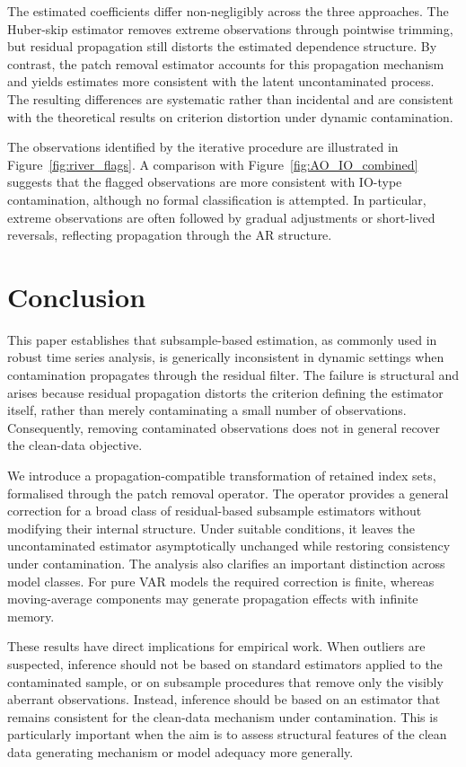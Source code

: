 \documentclass[12pt]{article}
\numberwithin{equation}{section}
\begin{document}
The estimated coefficients differ non-negligibly across the three approaches. 
The Huber-skip estimator removes extreme observations through pointwise trimming, but residual propagation still distorts the estimated dependence structure. 
By contrast, the patch removal estimator accounts for this propagation mechanism and yields estimates more consistent with the latent uncontaminated process. 
The resulting differences are systematic rather than incidental and are consistent with the theoretical results on criterion distortion under dynamic contamination.

The observations identified by the iterative procedure are illustrated in Figure~\ref{fig:river_flags}. 
A comparison with Figure~\ref{fig:AO_IO_combined} suggests that the flagged observations are more consistent with IO-type contamination, although no formal classification is attempted. 
In particular, extreme observations are often followed by gradual adjustments or short-lived reversals, reflecting propagation through the AR structure.


\section{Conclusion}\label{sec:conclusion}

This paper establishes that subsample-based estimation, as commonly used in robust time series analysis, is generically inconsistent in dynamic settings when contamination propagates through the residual filter. 
The failure is structural and arises because residual propagation distorts the criterion defining the estimator itself, rather than merely contaminating a small number of observations. 
Consequently, removing contaminated observations does not in general recover the clean-data objective.

We introduce a propagation-compatible transformation of retained index sets, formalised through the patch removal operator. 
The operator provides a general correction for a broad class of residual-based subsample estimators without modifying their internal structure. 
Under suitable conditions, it leaves the uncontaminated estimator asymptotically unchanged while restoring consistency under contamination. 
The analysis also clarifies an important distinction across model classes.
For pure VAR models the required correction is finite, whereas moving-average components may generate propagation effects with infinite memory.

These results have direct implications for empirical work. 
When outliers are suspected, inference should not be based on standard estimators applied to the contaminated sample, or on subsample procedures that remove only the visibly aberrant observations. 
Instead, inference should be based on an estimator that remains consistent for the clean-data mechanism under contamination.
This is particularly important when the aim is to assess structural features of the clean data generating mechanism or model adequacy more generally.
\end{document}
